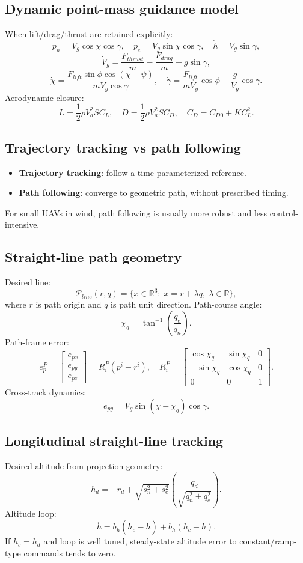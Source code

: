 \documentclass[11pt,a4paper]{article}
\newcommand{\R}{\mathbb{R}}
\begin{document}
\subsection{Dynamic point-mass guidance model}
When lift/drag/thrust are retained explicitly:
\[
\dot p_n=V_g\cos\chi\cos\gamma,\quad
\dot p_e=V_g\sin\chi\cos\gamma,\quad
\dot h=V_g\sin\gamma,
\]
\[
\dot V_g=\frac{F_{thrust}}{m}-\frac{F_{drag}}{m}-g\sin\gamma,
\]
\[
\dot\chi=\frac{F_{lift}\sin\phi\cos(\chi-\psi)}{mV_g\cos\gamma},
\quad
\dot\gamma=\frac{F_{lift}}{mV_g}\cos\phi-\frac{g}{V_g}\cos\gamma.
\]
Aerodynamic closure:
\[
L=\frac{1}{2}\rho V_a^2SC_L,\quad
D=\frac{1}{2}\rho V_a^2SC_D,\quad
C_D=C_{D0}+KC_L^2.
\]

\subsection{Trajectory tracking vs path following}
\begin{itemize}
  \item \textbf{Trajectory tracking}: follow a time-parameterized reference.
  \item \textbf{Path following}: converge to geometric path, without prescribed timing.
\end{itemize}
For small UAVs in wind, path following is usually more robust and less control-intensive.

\subsection{Straight-line path geometry}
Desired line:
\[
\mathcal{P}_{line}(r,q)=\{x\in\R^3:\;x=r+\lambda q,\;\lambda\in\R\},
\]
where $r$ is path origin and $q$ is path unit direction. Path-course angle:
\[
\chi_q=\tan^{-1}\!\left(\frac{q_e}{q_n}\right).
\]
Path-frame error:
\[
e_p^P=\begin{bmatrix}e_{px}\\e_{py}\\e_{pz}\end{bmatrix}=R_i^P(p^i-r^i),\quad
R_i^P=
\begin{bmatrix}
\cos\chi_q & \sin\chi_q & 0\\
-\sin\chi_q & \cos\chi_q & 0\\
0 & 0 & 1
\end{bmatrix}.
\]
Cross-track dynamics:
\[
\dot e_{py}=V_g\sin(\chi-\chi_q)\cos\gamma.
\]

\subsection{Longitudinal straight-line tracking}
Desired altitude from projection geometry:
\[
h_d=-r_d+\sqrt{s_n^2+s_e^2}\left(\frac{q_d}{\sqrt{q_n^2+q_e^2}}\right).
\]
Altitude loop:
\[
\ddot h=b_{\dot h}(\dot h_c-\dot h)+b_h(h_c-h).
\]
If $h_c=h_d$ and loop is well tuned, steady-state altitude error to constant/ramp-type commands tends to zero.
\end{document}

